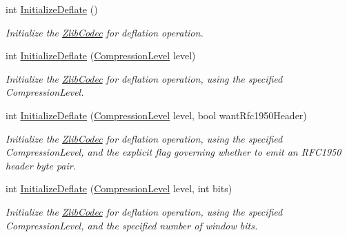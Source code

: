 \begin{DoxyCompactItemize}
int \mbox{\hyperlink{class_super_tiled2_unity_1_1_ionic_1_1_zlib_1_1_zlib_codec_a8554eab826711fc8aaccfc039cf2f372}{Initialize\+Deflate}} ()
\begin{DoxyCompactList}\small\item\em Initialize the \mbox{\hyperlink{class_super_tiled2_unity_1_1_ionic_1_1_zlib_1_1_zlib_codec}{Zlib\+Codec}} for deflation operation. \end{DoxyCompactList}\item 
int \mbox{\hyperlink{class_super_tiled2_unity_1_1_ionic_1_1_zlib_1_1_zlib_codec_aae6025281e278a40df628d36d5978489}{Initialize\+Deflate}} (\mbox{\hyperlink{namespace_super_tiled2_unity_1_1_ionic_1_1_zlib_a20f6771804996c363f454ad9765cd7db}{Compression\+Level}} level)
\begin{DoxyCompactList}\small\item\em Initialize the \mbox{\hyperlink{class_super_tiled2_unity_1_1_ionic_1_1_zlib_1_1_zlib_codec}{Zlib\+Codec}} for deflation operation, using the specified Compression\+Level. \end{DoxyCompactList}\item 
int \mbox{\hyperlink{class_super_tiled2_unity_1_1_ionic_1_1_zlib_1_1_zlib_codec_a9fb0d3886b2c4739307430311bf5eb3a}{Initialize\+Deflate}} (\mbox{\hyperlink{namespace_super_tiled2_unity_1_1_ionic_1_1_zlib_a20f6771804996c363f454ad9765cd7db}{Compression\+Level}} level, bool want\+Rfc1950\+Header)
\begin{DoxyCompactList}\small\item\em Initialize the \mbox{\hyperlink{class_super_tiled2_unity_1_1_ionic_1_1_zlib_1_1_zlib_codec}{Zlib\+Codec}} for deflation operation, using the specified Compression\+Level, and the explicit flag governing whether to emit an R\+F\+C1950 header byte pair. \end{DoxyCompactList}\item 
int \mbox{\hyperlink{class_super_tiled2_unity_1_1_ionic_1_1_zlib_1_1_zlib_codec_a329599d94558959d401bef274faf3842}{Initialize\+Deflate}} (\mbox{\hyperlink{namespace_super_tiled2_unity_1_1_ionic_1_1_zlib_a20f6771804996c363f454ad9765cd7db}{Compression\+Level}} level, int bits)
\begin{DoxyCompactList}\small\item\em Initialize the \mbox{\hyperlink{class_super_tiled2_unity_1_1_ionic_1_1_zlib_1_1_zlib_codec}{Zlib\+Codec}} for deflation operation, using the specified Compression\+Level, and the specified number of window bits. \end{DoxyCompactList}\item 

\end{DoxyCompactItemize}
